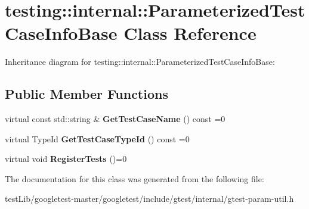 \hypertarget{classtesting_1_1internal_1_1ParameterizedTestCaseInfoBase}{}\section{testing\+:\+:internal\+:\+:Parameterized\+Test\+Case\+Info\+Base Class Reference}
\label{classtesting_1_1internal_1_1ParameterizedTestCaseInfoBase}


Inheritance diagram for testing\+:\+:internal\+:\+:Parameterized\+Test\+Case\+Info\+Base\+:
\subsection*{Public Member Functions}
\begin{DoxyCompactItemize}
\item 
\mbox{\label{classtesting_1_1internal_1_1ParameterizedTestCaseInfoBase_ac69b3bc29debfd6d891b7f5b2d088b1c}} 
virtual const std\+::string \& {\bfseries Get\+Test\+Case\+Name} () const =0
\item 
\mbox{\label{classtesting_1_1internal_1_1ParameterizedTestCaseInfoBase_a932b4a9185a72d5bdfa5fd84fc06cbca}} 
virtual Type\+Id {\bfseries Get\+Test\+Case\+Type\+Id} () const =0
\item 
\mbox{\label{classtesting_1_1internal_1_1ParameterizedTestCaseInfoBase_a92baca6c64c822c2e7043217f7903ef2}} 
virtual void {\bfseries Register\+Tests} ()=0
\end{DoxyCompactItemize}


The documentation for this class was generated from the following file\+:\begin{DoxyCompactItemize}
\item 
test\+Lib/googletest-\/master/googletest/include/gtest/internal/gtest-\/param-\/util.\+h\end{DoxyCompactItemize}
